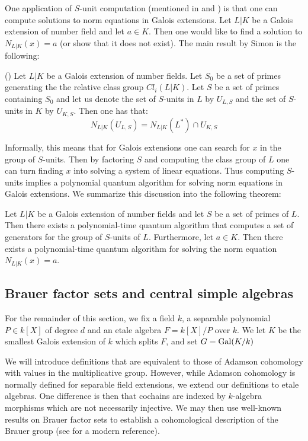 One application of $S$-unit computation (mentioned in \cite{biasse2016efficient} and \cite{simon2002solving}) is that one can compute solutions to norm equations in Galois extensions. Let $L|K$ be a Galois extension of number field and let $a\in K$. Then one would like to find a solution to  $N_{L|K}(x)=a$ (or show that it does not exist). The main result by Simon is the following: 
\begin{theorem}(\cite[Theorem 4.2]{simon2002solving})
Let $L|K$ be a Galois extension of number fields. Let $S_0$ be a set of primes generating the the relative class group $Cl_i(L|K)$. Let $S$ be a set of primes containing $S_0$ and let us denote the set of $S$-units in $L$ by $U_{L,S}$ and the set of $S$-units in $K$ by $U_{K,S}$. Then one has that: 
$$N_{L|K}(U_{L,S})=N_{L|K}(L^{*})\cap U_{K,S}$$
\end{theorem}
Informally, this means that for Galois extensions one can search for $x$ in the group of $S$-units. Then by factoring $S$ and computing the class group of $L$ one can turn finding $x$ into solving a system of linear equations. Thus computing $S$-units implies a polynomial quantum algorithm for solving norm equations in Galois extensions. We summarize this discussion into the following theorem: 
\begin{theorem}\label{thm:s-unit&norm}
Let $L|K$ be a Galois extension of number fields and let $S$ be a set of primes of $L$. Then there exists a polynomial-time quantum algorithm that computes a set of generators for the group of $S$-units of $L$. Furthermore, let $a\in K$. Then there exists a polynomial-time quantum algorithm for solving the norm equation $N_{L|K}(x)=a$. 
\end{theorem}

\subsection{Brauer factor sets and central simple algebras}\label{Sec:BrauerPrelim}
For the remainder of this section, we fix a field \(k\), a separable polynomial \(P \in k[X]\) of degree \(d\) and an etale algebra \(F = k[X]/P\) over \(k\). We let \(K\) be the smallest Galois extension of \(k\) which splits \(F\), and set \(G = \operatorname{Gal}(K/k)\)

We will introduce definitions that are equivalent to those of Adamson cohomology \cite{adamson1954cohomology} with values in the multiplicative group. However, while Adamson cohomology is normally defined for separable field extensions, we extend our definitions to etale algebras. One difference is then that cochains are indexed by \(k\)-algebra morphisms which are not necessarily injective. We may then use well-known results on Brauer factor sets to establish a cohomological description of the Brauer group (see \cite[Chapter 3]{jacobson2009finite} for a modern reference).

